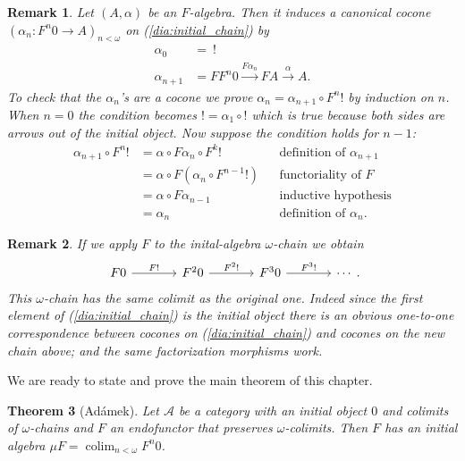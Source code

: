 \documentclass[letterpaper, 11pt, oneside]{memoir}
\theoremstyle{myteo}
\newtheorem{theorem}{Theorem}[section]
\newtheorem{remark}[theorem]{Remark}
\numberwithin{equation}{section}
\DeclareMathOperator*\colim{colim}
\newcommand{\A}{\mathscr{A}}
\begin{document}
\begin{remark}
  \label{rem:induced_cocone}
  Let \((A, \alpha)\) be an \(F\)-algebra.
  Then it induces a canonical cocone \((\alpha_n \colon F^n0 \to A)_{n < \omega}\) on (\ref{dia:initial_chain}) by
  \begin{align*}
    \alpha_0 &=\ ! \\
    \alpha_{n+1} &= FF^n0 \xrightarrow{F\alpha_n} FA \xrightarrow{\alpha} A.
  \end{align*}
  To check that the \(\alpha_n\)'s are a cocone we prove \(\alpha_n = \alpha_{n+1} \circ F^n!\) by induction on \(n\).
  When \(n = 0\) the condition becomes \(! = \alpha_1 \circ !\) which is true because both sides are arrows out of the initial object.
  Now suppose the condition holds for \(n - 1\):
  \begin{align*}
    \alpha_{n+1} \circ F^n! &= \alpha \circ F\alpha_n \circ F^k! && \text{definition of \(\alpha_{n+1}\)}\\
    &= \alpha \circ F(\alpha_n \circ F^{n-1}!) && \text{functoriality of \(F\)}\\
    &= \alpha \circ F\alpha_{n-1} && \text{inductive hypothesis}\\
    &= \alpha_n && \text{definition of \(\alpha_n\)}.
  \end{align*}
\end{remark}

\begin{remark}
  If we apply \(F\) to the inital-algebra \(\omega\)-chain we obtain
  \begin{equation}
    \label{dia:initial_chain_F}
    \begin{tikzcd}[sep = large]
      F0 \ar[r, "F!"] & F^20 \ar[r, "F^2!"] & F^30 \ar[r, "F^3!"] & \cdots
    \end{tikzcd}.
  \end{equation}
  This \(\omega\)-chain has the same colimit as the original one.
  Indeed since the first element of (\ref{dia:initial_chain}) is the initial object there is an obvious one-to-one correspondence between cocones on (\ref{dia:initial_chain}) and cocones on the new chain above; and the same factorization morphisms work.
\end{remark}

We are ready to state and prove the main theorem of this chapter.

\begin{theorem}[Adámek]
  \label{teo:adamek}
  Let \(\A\) be a category with an initial object \(0\) and colimits of \(\omega\)-chains and \(F\) an endofunctor that preserves \(\omega\)-colimits.
  Then \(F\) has an initial algebra \(\mu F = \colim_{n < \omega}F^n0\).
\end{theorem}
\end{document}
